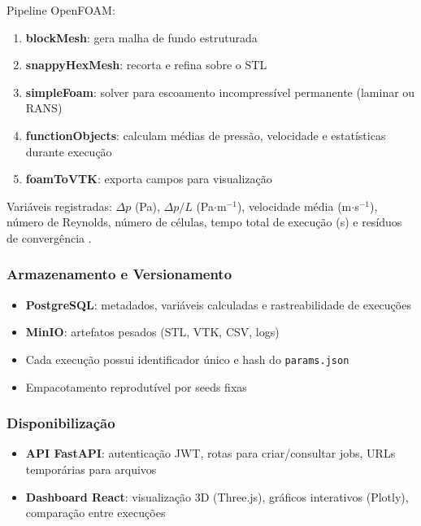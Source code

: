 Pipeline OpenFOAM:
\begin{enumerate}
    \item \textbf{blockMesh}: gera malha de fundo estruturada
    \item \textbf{snappyHexMesh}: recorta e refina sobre o STL
    \item \textbf{simpleFoam}: solver para escoamento incompressível permanente (laminar ou RANS)
    \item \textbf{functionObjects}: calculam médias de pressão, velocidade e estatísticas durante execução
    \item \textbf{foamToVTK}: exporta campos para visualização
\end{enumerate}

Variáveis registradas: $\Delta p$ (Pa), $\Delta p/L$ (Pa$\cdot$m$^{-1}$), velocidade média (m$\cdot$s$^{-1}$), número de Reynolds, número de células, tempo total de execução (s) e resíduos de convergência \cite{openfoam2023, versteeg2007}.

\subsubsection{Armazenamento e Versionamento}

\begin{itemize}
    \item \textbf{PostgreSQL}: metadados, variáveis calculadas e rastreabilidade de execuções
    \item \textbf{MinIO}: artefatos pesados (STL, VTK, CSV, logs)
    \item Cada execução possui identificador único e hash do \texttt{params.json}
    \item Empacotamento reprodutível por seeds fixas
\end{itemize}

\subsubsection{Disponibilização}

\begin{itemize}
    \item \textbf{API FastAPI}: autenticação JWT, rotas para criar/consultar jobs, URLs temporárias para arquivos
    \item \textbf{Dashboard React}: visualização 3D (Three.js), gráficos interativos (Plotly), comparação entre execuções
\end{itemize}

